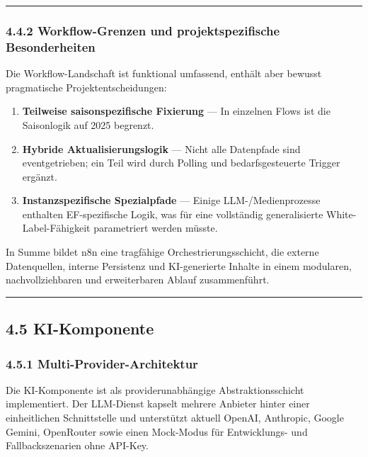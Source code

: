 \begin{center}\rule{0.5\linewidth}{0.5pt}\end{center}

\subsubsection{4.4.2 Workflow-Grenzen und projektspezifische
Besonderheiten}\label{workflow-grenzen-und-projektspezifische-besonderheiten}

Die Workflow-Landschaft ist funktional umfassend, enthält aber bewusst
pragmatische Projektentscheidungen:

\begin{enumerate}
\def\labelenumi{\arabic{enumi}.}
\tightlist
\item
  \textbf{Teilweise saisonspezifische Fixierung} --- In einzelnen Flows
  ist die Saisonlogik auf 2025 begrenzt.
\item
  \textbf{Hybride Aktualisierungslogik} --- Nicht alle Datenpfade sind
  eventgetrieben; ein Teil wird durch Polling und bedarfsgesteuerte
  Trigger ergänzt.
\item
  \textbf{Instanzspezifische Spezialpfade} --- Einige
  LLM-/Medienprozesse enthalten EF-spezifische Logik, was für eine
  vollständig generalisierte White-Label-Fähigkeit parametriert werden
  müsste.
\end{enumerate}

In Summe bildet n8n eine tragfähige Orchestrierungsschicht, die externe
Datenquellen, interne Persistenz und KI-generierte Inhalte in einem
modularen, nachvollziehbaren und erweiterbaren Ablauf zusammenführt.

\begin{center}\rule{0.5\linewidth}{0.5pt}\end{center}

\subsection{4.5 KI-Komponente}\label{ki-komponente}

\subsubsection{4.5.1
Multi-Provider-Architektur}\label{multi-provider-architektur}

Die KI-Komponente ist als providerunabhängige Abstraktionsschicht
implementiert. Der LLM-Dienst kapselt mehrere Anbieter hinter einer
einheitlichen Schnittstelle und unterstützt aktuell OpenAI, Anthropic,
Google Gemini, OpenRouter sowie einen Mock-Modus für Entwicklungs- und
Fallbackszenarien ohne API-Key.

